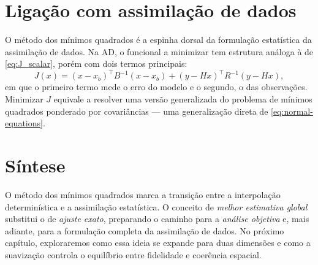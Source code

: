 \section{Ligação com assimilação de dados}
O método dos mínimos quadrados é a espinha dorsal da formulação estatística da assimilação de dados.  
Na AD, o funcional a minimizar tem estrutura análoga à de \eqref{eq:J_scalar}, porém com dois termos principais:
\begin{equation}
J(x) = (x - x_b)^\top B^{-1} (x - x_b)
     + (y - Hx)^\top R^{-1} (y - Hx),
\label{eq:J-DA}
\end{equation}
em que o primeiro termo mede o erro do modelo e o segundo, o das observações.  
Minimizar $J$ equivale a resolver uma versão generalizada do problema de mínimos quadrados ponderado por covariâncias — uma generalização direta de \eqref{eq:normal-equations}.

\section{Síntese}
O método dos mínimos quadrados marca a transição entre a interpolação determinística e a assimilação estatística.  
O conceito de \emph{melhor estimativa global} substitui o de \emph{ajuste exato}, preparando o caminho para a \emph{análise objetiva} e, mais adiante, para a formulação completa da assimilação de dados.  
No próximo capítulo, exploraremos como essa ideia se expande para duas dimensões e como a suavização controla o equilíbrio entre fidelidade e coerência espacial.

